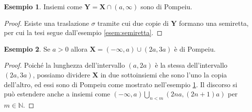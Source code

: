 \documentclass[12pt]{article}
\newcommand\ins[1]{\mathbf #1}
\newcommand\pom{di Pompeiu}
\theoremstyle{definition}
\newtheorem{esem}{Esempio}
\begin{document}
\begin{esem}\label{es:semiretta-tratti}
Insiemi come $\ins Y=\ins X\cap(a,\infty)$ sono \pom{}.
\end{esem}
\begin{proof}
Esiste una traslazione $\sigma$ tramite cui due copie di $\ins Y$
formano una semiretta, per cui la tesi segue dall'esempio \ref{esem:semiretta}.
\end{proof}

\begin{esem}Se $a>0$ allora $\ins X=(-\infty,a)\cup(2a,3a)$ è \pom{}.
\end{esem}
\begin{proof}
Poiché la lunghezza dell'intervallo $(a,2a)$ è la stessa dell'intervallo $(2a,3a)$,
possiamo dividere $\ins X$ in due sottoinsiemi che sono l'uno la copia dell'altro,
ed essi sono \pom{} come mostrato nell'esempio \ref{es:semiretta-tratti}.
Il discorso si può estendere anche a insiemi come
$(-\infty,a)\bigcup_{n<m}(2na,(2n+1)a)$ per $m\in\mathbb N$.
\end{proof}
\end{document}
